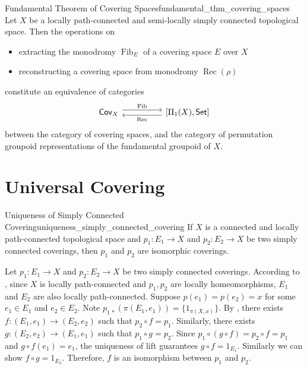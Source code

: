\documentclass{report}
\begin{document}
\begin{theorem}{Fundamental Theorem of Covering Spaces}{fundamental_thm_covering_spaces}
	Let $X$ be a locally path-connected and semi-locally simply connected topological space. Then the operations on
	\begin{itemize}
		\item extracting the monodromy $\operatorname{Fib}_E$ of a covering space $E$ over $X$
		\item reconstructing a covering space from monodromy $\operatorname{Rec}(\rho)$
	\end{itemize}
	constitute an equivalence of categories
	\begin{equation*}
		\begin{tikzcd}[ampersand replacement=\&, row sep=tiny]
			\mathsf{Cov}_X \arrow[rr, shift left=0.75ex, "\operatorname{Fib}"] \& \& \left[\Pi_1(X),\mathsf{Set}\right] \arrow[ll, shift left=0.75ex, "\operatorname{Rec}"]
		\end{tikzcd}
	\end{equation*}
	between the category of covering spaces, and the category of permutation groupoid representations of the fundamental groupoid of $X$.
\end{theorem}




\section{Universal Covering}

\begin{proposition}{Uniqueness of Simply Connected Covering}{uniqueness_simply_connected_covering}
	If $X$ is a connected and locally path-connected topological space and $p_1:E_1\to X$ and $p_2:E_2\to X$ be two simply connected coverings, then $p_1$ and $p_2$ are isomorphic coverings.
\end{proposition}

\begin{prf}
	Let $p_1:E_1\to X$ and $p_2:E_2\to X$ be two simply connected coverings. According to , since $X$ is locally path-connected and $p_1,p_2$ are locally homeomorphisms, $E_1$ and $E_2$ are also locally path-connected. Suppose $p(e_1)=p(e_2)=x$ for some $e_1\in E_1$ and $e_2\in E_2$. Note $p_{1\,*}(\pi(E_1,e_1))=\{1_{\pi(X,x)}\}$. By , there exists $f:(E_1,e_1)\to (E_2,e_2)$ such that $p_2\circ f=p_1$. Similarly, there exists $g:(E_2,e_2)\to (E_1,e_1)$ such that $p_1\circ g=p_2$. Since $p_1\circ (g\circ f)=p_2\circ f=p_1$ and $g\circ f(e_1)=e_1$, the uniqueness of lift guarantees $g\circ f=1_{E_1}$. Similarly we can show $f\circ g=1_{E_2}$. Therefore, $f$ is an isomorphism between $p_1$ and $p_2$.
\end{prf}
\end{document}
